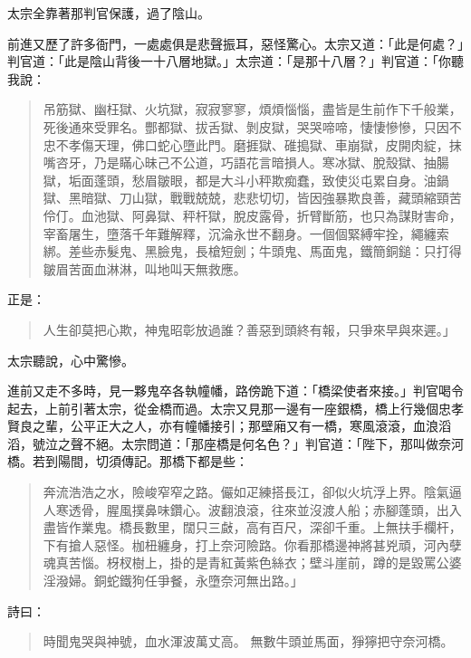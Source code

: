 太宗全靠著那判官保護，過了陰山。

前進又歷了許多衙門，一處處俱是悲聲振耳，惡怪驚心。太宗又道：「此是何處？」判官道：「此是陰山背後一十八層地獄。」太宗道：「是那十八層？」判官道：「你聽我說：
\begin{quote}
吊筋獄、幽枉獄、火坑獄，寂寂寥寥，煩煩惱惱，盡皆是生前作下千般業，死後通來受罪名。酆都獄、拔舌獄、剝皮獄，哭哭啼啼，悽悽慘慘，只因不忠不孝傷天理，佛口蛇心墮此門。磨捱獄、碓搗獄、車崩獄，皮開肉綻，抹嘴咨牙，乃是瞞心昧己不公道，巧語花言暗損人。寒冰獄、脫殼獄、抽腸獄，垢面蓬頭，愁眉皺眼，都是大斗小秤欺痴蠢，致使災屯累自身。油鍋獄、黑暗獄、刀山獄，戰戰兢兢，悲悲切切，皆因強暴欺良善，藏頭縮頸苦伶仃。血池獄、阿鼻獄、秤杆獄，脫皮露骨，折臂斷筋，也只為謀財害命，宰畜屠生，墮落千年難解釋，沉淪永世不翻身。一個個緊縛牢拴，繩纏索綁。差些赤髮鬼、黑臉鬼，長槍短劍；牛頭鬼、馬面鬼，鐵簡銅鎚：只打得皺眉苦面血淋淋，叫地叫天無救應。
\end{quote}
正是：
\begin{quote}
人生卻莫把心欺，神鬼昭彰放過誰？善惡到頭終有報，只爭來早與來遲。」
\end{quote}

太宗聽說，心中驚慘。

進前又走不多時，見一夥鬼卒各執幢幡，路傍跪下道：「橋梁使者來接。」判官喝令起去，上前引著太宗，從金橋而過。太宗又見那一邊有一座銀橋，橋上行幾個忠孝賢良之輩，公平正大之人，亦有幢幡接引；那壁廂又有一橋，寒風滾滾，血浪滔滔，號泣之聲不絕。太宗問道：「那座橋是何名色？」判官道：「陛下，那叫做奈河橋。若到陽間，切須傳記。那橋下都是些：
\begin{quote}
奔流浩浩之水，險峻窄窄之路。儼如疋練搭長江，卻似火坑浮上界。陰氣逼人寒透骨，腥風撲鼻味鑽心。波翻浪滾，往來並沒渡人船；赤腳蓬頭，出入盡皆作業鬼。橋長數里，闊只三㪥，高有百尺，深卻千重。上無扶手欄杆，下有搶人惡怪。枷杻纏身，打上奈河險路。你看那橋邊神將甚兇頑，河內孽魂真苦惱。枒杈樹上，掛的是青紅黃紫色絲衣；壁斗崖前，蹲的是毀罵公婆淫潑婦。銅蛇鐵狗任爭餐，永墮奈河無出路。」
\end{quote}

詩曰：
\begin{quote}
時聞鬼哭與神號，血水渾波萬丈高。
無數牛頭並馬面，猙獰把守奈河橋。
\end{quote}

